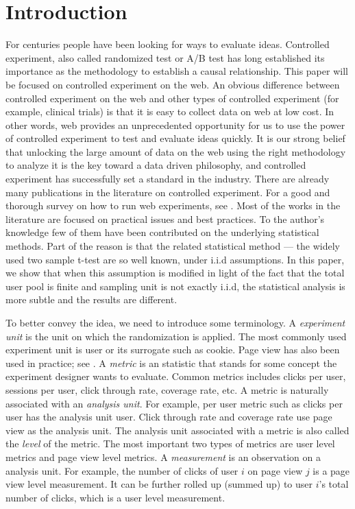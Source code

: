 \documentclass[10pt]{article}
\newcommand{\ci}{\citeasnoun}
\begin{document}
\section{Introduction}
For centuries people have been looking for ways to evaluate ideas. Controlled experiment, also called randomized test or A/B test has long established its importance as the methodology to establish a causal relationship. This paper will be focused on controlled experiment on the web. An obvious difference between controlled experiment on the web and other types of controlled experiment (for example, clinical trials) is that it is easy to collect data on web at low cost. In other words, web provides an unprecedented opportunity for us to use the power of controlled experiment to test and evaluate ideas quickly. It is our strong belief that unlocking the large amount of data on the web using the right methodology to analyze it is the key toward a data driven philosophy, and controlled experiment has successfully set a standard in the industry.  There are already many publications in the literature on controlled experiment. For a good and thorough survey on how to run web experiments, see \ci{expsurvey}.  Most of the works in the literature are focused on practical issues and best practices. To the author's knowledge few of them have been contributed on the underlying statistical methods. Part of the reason is that the related statistical method --- the widely used two sample t-test are so well known, under i.i.d assumptions. In this paper, we show that when this assumption is modified in light of the fact that the total user pool is finite and sampling unit is not exactly i.i.d, the statistical analysis is more subtle and the results are different. 

To better convey the idea, we need to introduce some terminology. A \emph{experiment unit} is the unit on which the randomization is applied. The most commonly used experiment unit is user or its surrogate such as cookie. Page view has also been used in practice; see \ci{googlesurvey}.  A \emph{metric} is an statistic that stands for some concept the experiment designer wants to evaluate. Common metrics includes clicks per user, sessions per user, click through rate, coverage rate, etc. A metric is naturally associated with an \emph{analysis unit}. For example, per user metric such as clicks per user has the analysis unit user. Click through rate and coverage rate use page view as the analysis unit. The analysis unit associated with a metric is also called the \emph{level} of the metric. The most important two types of metrics are user level metrics and page view level metrics.  A \emph{measurement} is an observation on a analysis unit. For example, the number of clicks of user $i$ on page view $j$ is a page view level measurement. It can be further rolled up (summed up) to user $i$'s total number of clicks, which is a user level measurement. 
\end{document}

